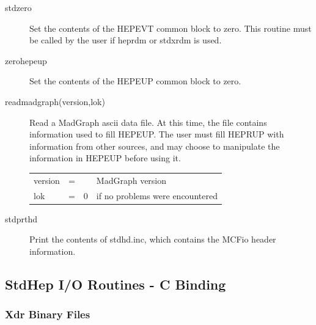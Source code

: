\begin{description}

\item[stdzero]
 Set the contents of the HEPEVT common block to zero.
 This routine must be called by the user if heprdm or stdxrdm is used.

\item[zerohepeup]
 Set the contents of the HEPEUP common block to zero.

\item[readmadgraph(version,lok)]
 Read a MadGraph ascii data file.
 At this time, the file contains information used to fill HEPEUP.
 The user must fill HEPRUP with information from other sources,
 and may choose to manipulate the information in HEPEUP before using it.

\begin{tabular}{lcll}
version & = &  & MadGraph version \\
lok  & = & 0  & if no problems were encountered \\
\end{tabular}

\item[stdprthd]
 Print the contents of stdhd.inc, which contains the MCFio header information.

\end{description}

\subsection{StdHep I/O Routines - C Binding}

\subsubsection{Xdr Binary Files}

